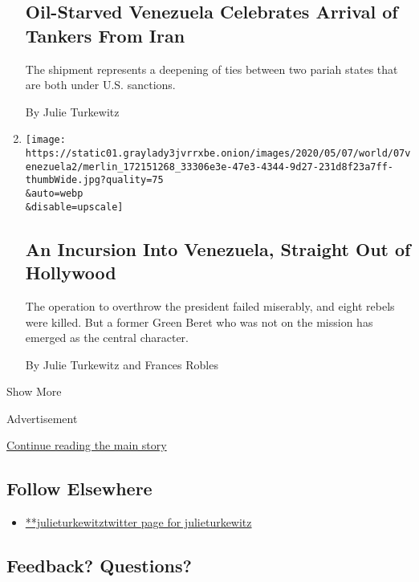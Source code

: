 \begin{enumerate}
  \hypertarget{oil-starved-venezuela-celebrates-arrival-of-tankers-from-iran}{%
  \subsection{Oil-Starved Venezuela Celebrates Arrival of Tankers From
  Iran}\label{oil-starved-venezuela-celebrates-arrival-of-tankers-from-iran}}

  The shipment represents a deepening of ties between two pariah states
  that are both under U.S. sanctions.

  By Julie Turkewitz
\item
  \href{/2020/05/07/world/americas/venezuela-failed-overthrow.html}{}

  \texttt{[image: https://static01.graylady3jvrrxbe.onion/images/2020/05/07/world/07venezuela2/merlin\_172151268\_33306e3e-47e3-4344-9d27-231d8f23a7ff-thumbWide.jpg?quality=75\\\&auto=webp\\\&disable=upscale]}

  \hypertarget{an-incursion-into-venezuela-straight-out-of-hollywood}{%
  \subsection{An Incursion Into Venezuela, Straight Out of
  Hollywood}\label{an-incursion-into-venezuela-straight-out-of-hollywood}}

  The operation to overthrow the president failed miserably, and eight
  rebels were killed. But a former Green Beret who was not on the
  mission has emerged as the central character.

  By Julie Turkewitz and Frances Robles
\end{enumerate}

Show More

Advertisement

\protect\hyperlink{after-mid2}{Continue reading the main story}

\hypertarget{follow-elsewhere}{%
\subsection{Follow Elsewhere}\label{follow-elsewhere}}

\begin{itemize}
\tightlist
\item
  \href{https://twitter.com/julieturkewitz}{**julieturkewitztwitter page
  for julieturkewitz}
\end{itemize}

\hypertarget{feedback-questions}{%
\subsection{Feedback? Questions?}\label{feedback-questions}}

